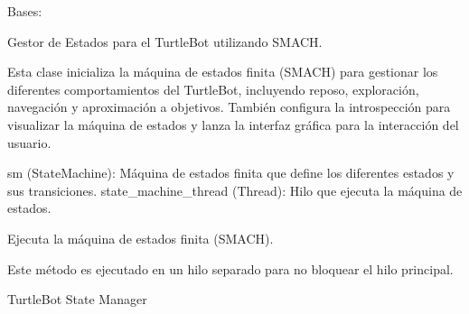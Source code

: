 \documentclass[a4paper,10pt,spanish]{sphinxmanual}
\begin{document}
\begin{fulllineitems}
\label{\detokenize{squad_state_manager:squad_state_manager.TurtleBotStateManager}}
\pysigstartsignatures
{}
\pysigstopsignatures
\sphinxAtStartPar
Bases: 

\sphinxAtStartPar
Gestor de Estados para el TurtleBot utilizando SMACH.

\sphinxAtStartPar
Esta clase inicializa la máquina de estados finita (SMACH) para gestionar los diferentes
comportamientos del TurtleBot, incluyendo reposo, exploración, navegación y aproximación a
objetivos. También configura la introspección para visualizar la máquina de estados y
lanza la interfaz gráfica para la interacción del usuario.
\begin{description}
\sphinxAtStartPar
sm (StateMachine): Máquina de estados finita que define los diferentes estados y sus transiciones.
state\_machine\_thread (Thread): Hilo que ejecuta la máquina de estados.

\end{description}

\begin{fulllineitems}
\label{\detokenize{squad_state_manager:squad_state_manager.TurtleBotStateManager.run_state_machine}}
\pysigstartsignatures
{}
\pysigstopsignatures
\sphinxAtStartPar
Ejecuta la máquina de estados finita (SMACH).

\sphinxAtStartPar
Este método es ejecutado en un hilo separado para no bloquear el hilo principal.

\end{fulllineitems}


\end{fulllineitems}

\label{\detokenize{squad_state_manager:module-squad_interfaz}}
\sphinxAtStartPar
TurtleBot State Manager
\end{document}
